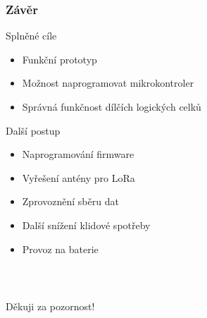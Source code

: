 \documentclass[%
  12pt,       				%
	t,                  %
	aspectratio=1610,   %
	unicode,						%
]{beamer}				    	%
\begin{document}
\begin{frame} 
	\frametitle{Závěr}
	Splněné cíle
	\begin{itemize}
		\item Funkční prototyp
		\item Možnost naprogramovat mikrokontroler
		\item Správná funkčnost dílčích logických celků
	\end{itemize}
	Další postup
	\begin{itemize}
		\item Naprogramování firmware
		\item Vyřešení antény pro LoRa
		\item Zprovoznění sběru dat
		\item Další snížení klidové spotřeby
		\item Provoz na baterie
	\end{itemize}
\end{frame}


\begin{frame}[c] 
	\frametitle{\mbox{ }}
	\begin{center}
		{\Huge Děkuji za pozornost!}
	\end{center}
\end{frame}

\end{document}
